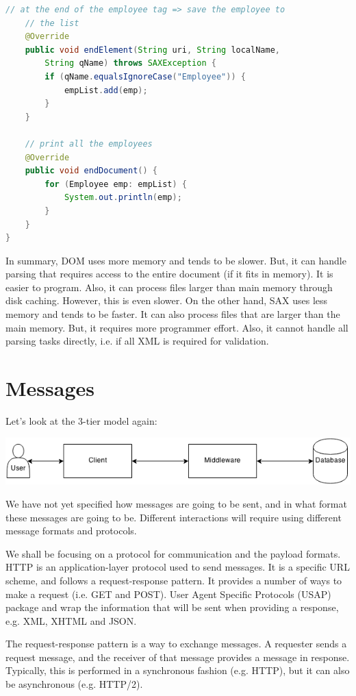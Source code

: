 \documentclass[a4paper, openany]{memoir}
\begin{document}
\begin{lstlisting}[language=java]
    // at the end of the employee tag => save the employee to 
    // the list
    @Override
    public void endElement(String uri, String localName, 
        String qName) throws SAXException {
        if (qName.equalsIgnoreCase("Employee")) {
            empList.add(emp);
        }
    }
    
    // print all the employees
    @Override
    public void endDocument() {
        for (Employee emp: empList) {
            System.out.println(emp);
        }
    }
}
\end{lstlisting}

\noindent In summary, DOM uses more memory and tends to be slower. But, it can handle parsing that requires access to the entire document (if it fits in memory). It is easier to program. Also, it can process files larger than main memory through disk caching. However, this is even slower. On the other hand, SAX uses less memory and tends to be faster. It can also process files that are larger than the main memory. But, it requires more programmer effort. Also, it cannot handle all parsing tasks directly, i.e. if all XML is required for validation.
\newpage

\section{Messages}
Let's look at the 3-tier model again:
\begin{center}
    \includegraphics[scale=0.8]{src/L8I1.png}
\end{center}
We have not yet specified how messages are going to be sent, and in what format these messages are going to be. Different interactions will require using different message formats and protocols.

\noindent We shall be focusing on a protocol for communication and the payload formats. HTTP is an application-layer protocol used to send messages. It is a specific URL scheme, and follows a request-response pattern. It provides a number of ways to make a request (i.e. GET and POST). User Agent Specific Protocols (USAP) package and wrap the information that will be sent when providing a response, e.g. XML, XHTML and JSON.

\noindent The request-response pattern is a way to exchange messages. A requester sends a request message, and the receiver of that message provides a message in response. Typically, this is performed in a synchronous fashion (e.g. HTTP), but it can also be asynchronous (e.g. HTTP/2).
\end{document}
